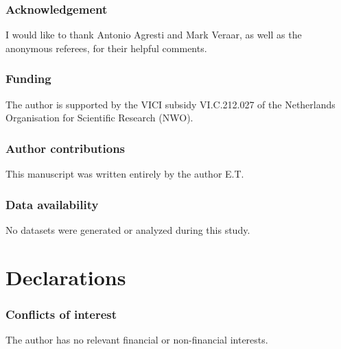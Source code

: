 \documentclass{amsart}
\newcommand{\<}{\langle}
\newcommand{\?}{\rangle}
\theoremstyle{plain}
\theoremstyle{remark}
\theoremstyle{plain}
\numberwithin{equation}{section}
\begin{document}
\subsubsection*{Acknowledgement}
I would like to thank Antonio Agresti and Mark Veraar, as well as the anonymous referees, for their helpful comments.

\subsubsection*{Funding} The author is supported by the VICI subsidy VI.C.212.027 of the Netherlands Organisation for Scientific Research (NWO). 

\vspace{-.15cm}
\subsubsection*{Author contributions} This manuscript was written entirely by the author E.T. 

\vspace{-.15cm}
\subsubsection*{Data availability} No datasets were generated or analyzed during this study.

\section*{Declarations}

\subsubsection*{Conflicts of interest} The author has no relevant financial or non-financial interests.

\printbibliography 
\end{document}

